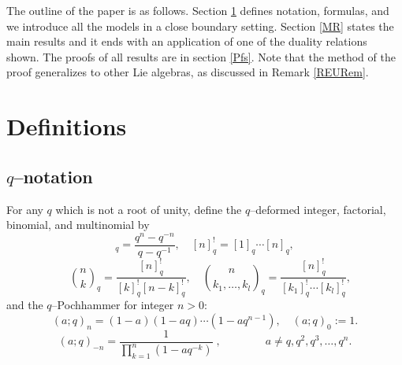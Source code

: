 \documentclass{ximera}
\begin{document}
The outline of the paper is as follows. Section \ref{Definitions} defines notation, formulas, and we introduce all the models in a close boundary setting. Section \ref{MR} states the main results and it ends with an application of one of the duality relations shown. The proofs of all results are in section \ref{Pfs}.  Note that the method of the proof generalizes to other Lie algebras, as discussed in Remark \ref{REURem}.
\section{Definitions}\label{Definitions}

\subsection{$q$--notation}
For any $q$ which is not a root of unity, define the $q$--deformed integer, factorial, binomial, and multinomial by 
\begin{equation*}
[n]_q = \frac{q^n-q^{-n}}{q-q^{-1}}, \quad [n]_q^! = [1]_q \cdots [n]_q, 
\end{equation*}
\begin{equation*}
    \quad \binom{n}{k}_q = \frac{[n]_q^!}{[k]_q^! [n-k]_q^!}, \quad \binom{n}{k_1,\ldots,k_l}_q = \frac{[n]_q^!}{[k_1]_q^! \cdots [k_l]_q^!},    
\end{equation*}
and the $q$--Pochhammer for integer $n>0$:
\begin{equation*}
(a ; q)_{n}=(1-a)(1-a q) \cdots\left(1-a q^{n-1}\right), \quad(a ; q)_{0}:=1.
\end{equation*}
\begin{equation*}
    (a;q)_{-n} = \frac{1}{\prod_{k=1}^n (1-aq^{-k})} \;, \qquad \qquad a \neq q,q^2,q^3, \ldots, q^n.
\end{equation*}
\end{document}
